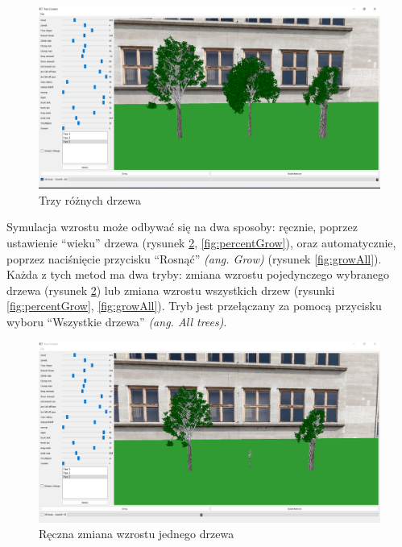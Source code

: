\documentclass[a4paper,twoside,12pt]{report}
\begin{document}
\begin{figure}[H]
	\centering\includegraphics[width=15.5cm]{grafika/program/beforeGrow.png}
	\caption{Trzy różnych drzewa}
    \label{fig:beforeGrow}
\end{figure}

Symulacja wzrostu może odbywać się na dwa sposoby: 
ręcznie, poprzez ustawienie ``wieku'' drzewa (rysunek \ref{fig:oneTree}, \ref{fig:percentGrow}), 
oraz automatycznie, poprzez naciśnięcie przycisku ``Rosnąć'' \textit{(ang. Grow)} (rysunek \ref{fig:growAll}). 
Każda z tych metod ma dwa tryby: zmiana wzrostu pojedynczego 
wybranego drzewa (rysunek \ref{fig:oneTree}) lub zmiana wzrostu wszystkich drzew (rysunki \ref{fig:percentGrow}, \ref{fig:growAll}). 
Tryb jest przełączany za pomocą przycisku wyboru ``Wszystkie drzewa'' \textit{(ang. All trees)}. 

\begin{figure}[H]
	\centering\includegraphics[width=15.5cm]{grafika/program/oneTreeGrow.png}
	\caption{Ręczna zmiana wzrostu jednego drzewa}
    \label{fig:oneTree}
\end{figure}
\end{document}

